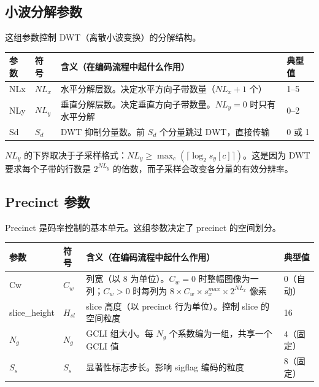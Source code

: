 \subsection{小波分解参数}

这组参数控制 DWT（离散小波变换）的分解结构。

\begin{table}[H]
\centering
\begin{tabular}{@{}llp{5.5cm}l@{}}
\toprule
参数 & 符号 & 含义（在编码流程中起什么作用） & 典型值 \\
\midrule
NLx & $NL_x$ & 水平分解层数。决定水平方向子带数量（$NL_x + 1$ 个） & 1--5 \\
NLy & $NL_y$ & 垂直分解层数。决定垂直方向子带数量。$NL_y = 0$ 时只有水平分解 & 0--2 \\
Sd & $S_d$ & DWT 抑制分量数。前 $S_d$ 个分量跳过 DWT，直接传输 & 0 或 1 \\
\bottomrule
\end{tabular}
\end{table}

\begin{engineeringnote}
$NL_y$ 的下界取决于子采样格式：$NL_y \geq \max_c(\lceil \log_2 s_y[c] \rceil)$。这是因为 DWT 要求每个子带的行数是 $2^{NL_y}$ 的倍数，而子采样会改变各分量的有效分辨率。
\end{engineeringnote}

\subsection{Precinct 参数}

Precinct 是码率控制的基本单元。这组参数决定了 precinct 的空间划分。

\begin{table}[H]
\centering
\begin{tabular}{@{}llp{5.5cm}l@{}}
\toprule
参数 & 符号 & 含义（在编码流程中起什么作用） & 典型值 \\
\midrule
Cw & $C_w$ & 列宽（以 8 为单位）。$C_w = 0$ 时整幅图像为一列；$C_w > 0$ 时每列为 $8 \times C_w \times s_x^{max} \times 2^{NL_x}$ 像素 & 0（自动） \\
slice\_height & $H_{sl}$ & slice 高度（以 precinct 行为单位）。控制 slice 的空间粒度 & 16 \\
$N_g$ & $N_g$ & GCLI 组大小。每 $N_g$ 个系数编为一组，共享一个 GCLI 值 & 4（固定） \\
$S_s$ & $S_s$ & 显著性标志步长。影响 sigflag 编码的粒度 & 8（固定） \\
\bottomrule
\end{tabular}
\end{table}

